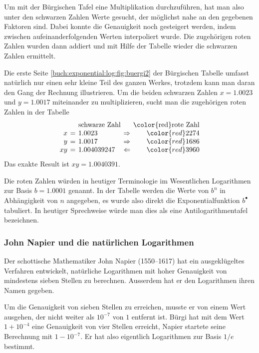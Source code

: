 Um mit der Bürgischen Tafel eine Multiplikation durchzuführen,
hat man also unter den schwarzen Zahlen Werte gesucht,
der möglichst nahe an den gegebenen Faktoren sind.
Dabei konnte die Genauigkeit noch gesteigert werden, indem zwischen
aufeinanderfolgenden Werten interpoliert wurde.
Die zugehörigen roten Zahlen wurden dann addiert und mit Hilfe der
Tabelle wieder die schwarzen Zahlen ermittelt.

\begin{beispiel}
Die erste Seite \ref{buch:exponential:log:fig:buergi2} der Bürgischen
Tabelle umfasst natürlich nur einen sehr kleine Teil des ganzen Werkes,
trotzdem kann man daran den Gang der Rechnung illustrieren.
Um die beiden schwarzen Zahlen $x=1.0023$ und $y=1.0017$ miteinander
zu multiplizieren, sucht man die zugehörigen roten Zahlen in
der Tabelle
\[
\renewcommand{\arraycolsep}{2pt}
\begin{array}{rclcr}
            & &\text{schwarze Zahl}&&\text{{\color{red}rote Zahl}} \\
           x&=&1.0023      &\Rightarrow&{\color{red}2274}\\
           y&=&1.0017      &\Rightarrow&{\color{red}1686}\\
          xy&=&1.004039247 &\Leftarrow &{\color{red}3960}
\end{array}
\]
Das exakte Result ist $xy=1.0040391$.
\end{beispiel}

Die roten Zahlen würden in heutiger Terminologie
im Wesentlichen Logarithmen zur Basis $b=1.0001$ genannt.
In der Tabelle werden die Werte von $b^n$ in Abhängigkeit von $n$
angegeben, es wurde also direkt die Exponentialfunktion $b^\bullet$
tabuliert.
In heutiger Sprechweise würde man dies als eine Antilogarithmentafel
bezeichnen.

%
%
\subsubsection{John Napier und die natürlichen Logarithmen}
Der schottische Mathematiker John Napier (1550--1617) hat ein
ausgeklügeltes Verfahren entwickelt, 
natürliche Logarithmen mit hoher Genauigkeit von mindestens sieben
Stellen zu berechnen.
Ausserdem hat er den Logarithmen ihren Namen gegeben.

Um die Genauigkeit von sieben Stellen zu erreichen, musste er von
einem Wert ausgehen, der nicht weiter als $10^{-7}$ von $1$ entfernt
ist.
Bürgi hat mit dem Wert $1+10^{-4}$ eine Genauigkeit von vier Stellen
erreicht, Napier startete seine Berechnung mit $1-10^{-7}$.
Er hat also eigentlich Logarithmen zur Basis $1/e$ bestimmt.

